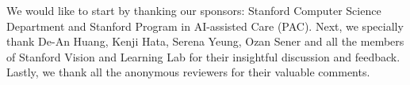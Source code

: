 We would like to start by thanking
our sponsors: Stanford Computer Science Department and Stanford Program in AI-assisted Care
(PAC). Next, we specially thank De-An Huang, Kenji Hata, Serena Yeung, Ozan Sener and all the members of Stanford Vision and Learning Lab for their insightful discussion and feedback. Lastly, we thank all the anonymous reviewers for their valuable comments.